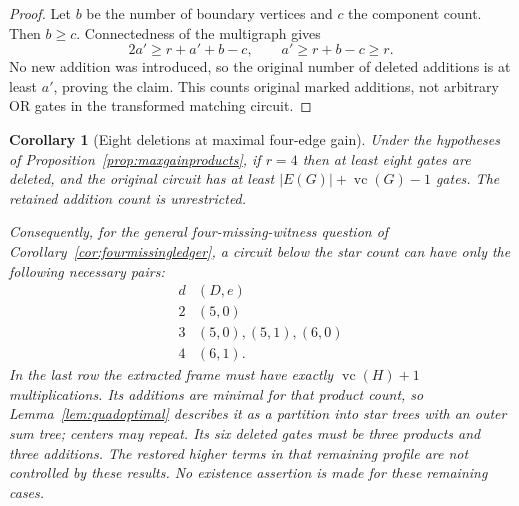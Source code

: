 \documentclass[11pt]{article}
\newcommand{\vc}{\operatorname{vc}}
\newtheorem{corollary}[theorem]{Corollary}
\theoremstyle{definition}
\theoremstyle{remark}
\begin{document}
\begin{proof}
Let $b$ be the number of boundary vertices and $c$ the component count. Then $b\ge c$. Connectedness of the multigraph gives
\[
 2a'\ge r+a'+b-c,\qquad a'\ge r+b-c\ge r.
\]
No new addition was introduced, so the original number of deleted additions is at least $a'$, proving the claim. This counts original marked additions, not arbitrary OR gates in the transformed matching circuit.
\end{proof}

\begin{corollary}[Eight deletions at maximal four-edge gain]\label{cor:fourminproduct}
Under the hypotheses of Proposition~\ref{prop:maxgainproducts}, if $r=4$ then at least eight gates are deleted, and the original circuit has at least $|E(G)|+\vc(G)-1$ gates. The retained addition count is unrestricted.

Consequently, for the general four-missing-witness question of Corollary~\ref{cor:fourmissingledger}, a circuit below the star count can have only the following necessary pairs:
\[
\begin{array}{c|l}
 d&(D,e)\\ \hline
 2&(5,0)\\
 3&(5,0),(5,1),(6,0)\\
 4&(6,1).
\end{array}
\]
In the last row the extracted frame must have exactly $\vc(H)+1$ multiplications. Its additions are minimal for that product count, so Lemma~\ref{lem:quadoptimal} describes it as a partition into star trees with an outer sum tree; centers may repeat. Its six deleted gates must be three products and three additions. The restored higher terms in that remaining profile are not controlled by these results. No existence assertion is made for these remaining cases.
\end{corollary}
\end{document}
